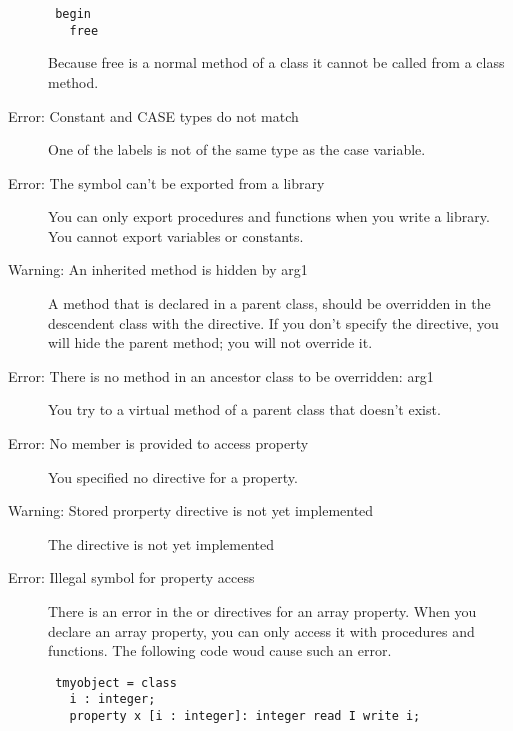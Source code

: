 \begin{description}
\begin{verbatim}
 begin
   free
 \end{verbatim}
 Because free is a normal method of a class it cannot be called from a class
 method.
\item [Error: Constant and CASE types do not match]
 One of the labels is not of the same type as the case variable.
\item [Error: The symbol can't be exported from a library]
 You can only export procedures and functions when you write a library. You
 cannot export variables or constants.
\item [Warning: An inherited method is hidden by arg1]
 A method that is declared  in a parent class, should be
 overridden in the descendent class with the  directive. If you
 don't specify the  directive, you will hide the parent method;
 you will not override it.
\item [Error: There is no method in an ancestor class to be overridden: arg1]
 You try to  a virtual method of a parent class that doesn't
 exist.
\item [Error: No member is provided to access property]
 You specified no  directive for a property.
\item [Warning: Stored prorperty directive is not yet implemented]
 The  directive is not yet implemented
\item [Error: Illegal symbol for property access]
 There is an error in the  or  directives for an array
 property. When you declare an array property, you can only access it with
 procedures and functions. The following code woud cause such an error.
 \begin{verbatim}
 tmyobject = class
   i : integer;
   property x [i : integer]: integer read I write i;
 \end{verbatim}


\end{description}
